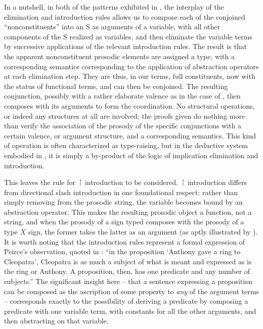 \documentclass[output=paper,colorlinks,citecolor=brown]{langscibook}
\begin{document}
In a nutshell, in both of the patterns exhibited in , the
interplay of the elimination and introduction rules allows us to
compose each of the conjoined ``nonconstituents'' into an S as arguments
of a variable, with all other components of the S realized as
variables, and then eliminate the variable terms by successive
applications of the relevant introduction rules. The result is that
the apparent nonconstituent prosodic elements are assigned a type,
with a corresponding semantics corresponding to the application of
abstraction operators at each elimination step. They are thus, in our
terms, full constituents, now with the status of functional terms, and
can then be conjoined. The resulting conjunction, possibly with a
rather elaborate valence as in the case of , then composes with
its arguments to form the coordination. No structural operations, or
indeed any structures at all are involved; the proofs given do
nothing more than verify the association of the prosody of the
specific conjunctions with a certain valence, or argument structure,
and a corresponding semantics. This kind of operation is often
characterized as type-raising, but in the deductive system embodied in
, it is simply a by-product of the logic of implication
elimination and introduction.

This leaves the rule for \ensuremath{\vs} introduction to be considered. \ensuremath{\vs}
introduction differs from directional slash introduction in one
foundational respect: rather than simply removing \pt{ \ensuremath{\greekp} } from the
prosodic string, the variable becomes bound by an abstraction
operator. This makes the resulting prosodic object a function, not a
string, and when the prosody of a sign typed  composes with
the prosody of a type $X$ sign, the former takes the latter as an
argument (as aptly illustrated by ).  It is worth
noting that the introduction rules represent a formal expression of
Peirce's observation, quoted in \citet[8]{nothPeirce}: ``in the proposition
{`}Anthony gave a ring to Cleopatra', Cleopatra is as much a subject of what is
meant and expressed as is the ring or Anthony. A proposition, then,
has one predicate and any number of subjects.'' The significant insight
here -- that a sentence expressing a proposition can be composed as the
ascription of some property to \emph{any} of the argument
terms -- corresponds exactly to the possibility of deriving a predicate
by composing a predicate with one variable term, with constants for
all the other arguments, and then abstracting on that
variable.
\end{document}
